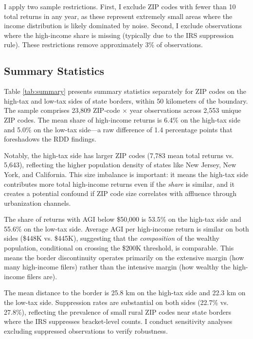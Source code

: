 \documentclass[12pt]{article}
\begin{document}
I apply two sample restrictions. First, I exclude ZIP codes with fewer than 10 total returns in any year, as these represent extremely small areas where the income distribution is likely dominated by noise. Second, I exclude observations where the high-income share is missing (typically due to the IRS suppression rule). These restrictions remove approximately 3\% of observations.

\subsection{Summary Statistics}



Table \ref{tab:summary} presents summary statistics separately for ZIP codes on the high-tax and low-tax sides of state borders, within 50 kilometers of the boundary. The sample comprises 23,809 ZIP-code $\times$ year observations across 2,553 unique ZIP codes. The mean share of high-income returns is 6.4\% on the high-tax side and 5.0\% on the low-tax side---a raw difference of 1.4 percentage points that foreshadows the RDD findings.

Notably, the high-tax side has larger ZIP codes (7,783 mean total returns vs. 5,643), reflecting the higher population density of states like New Jersey, New York, and California. This size imbalance is important: it means the high-tax side contributes more total high-income returns even if the \textit{share} is similar, and it creates a potential confound if ZIP code size correlates with affluence through urbanization channels.

The share of returns with AGI below \$50,000 is 53.5\% on the high-tax side and 55.6\% on the low-tax side. Average AGI per high-income return is similar on both sides (\$448K vs. \$445K), suggesting that the \textit{composition} of the wealthy population, conditional on crossing the \$200K threshold, is comparable. This means the border discontinuity operates primarily on the extensive margin (how many high-income filers) rather than the intensive margin (how wealthy the high-income filers are).

The mean distance to the border is 25.8 km on the high-tax side and 22.3 km on the low-tax side. Suppression rates are substantial on both sides (22.7\% vs. 27.8\%), reflecting the prevalence of small rural ZIP codes near state borders where the IRS suppresses bracket-level counts. I conduct sensitivity analyses excluding suppressed observations to verify robustness.
\end{document}

